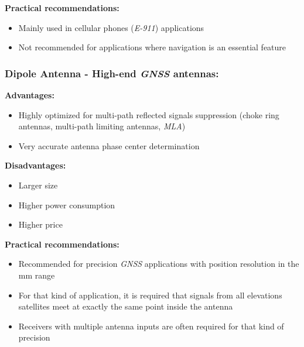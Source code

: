\documentclass[report.tex]{subfiles}
\begin{document}
\begin{flushleft}
\textbf{Practical recommendations:}
\end{flushleft}
\begin{itemize}
\item Mainly used in cellular phones (\textit{E-911}) applications
\item Not recommended for applications where navigation is an essential feature
\end{itemize}

\subsubsection{Dipole Antenna - High-end \textit{GNSS} antennas:}

\begin{flushleft}
\textbf{Advantages:}
\end{flushleft}
\begin{itemize}
\item Highly optimized for multi-path reflected signals suppression (choke ring antennas, multi-path limiting antennas, \textit{MLA})
\item Very accurate antenna phase center determination
\end{itemize}

\begin{flushleft}
\textbf{Disadvantages:}
\end{flushleft}
\begin{itemize}
\item Larger size
\item Higher power consumption
\item Higher price
\end{itemize}

\begin{flushleft}
\textbf{Practical recommendations:}
\end{flushleft}
\begin{itemize}
\item Recommended for precision \textit{GNSS} applications with position resolution in the \si{\milli\meter} range
\item For that kind of application, it is required that signals from all elevations  satellites meet at exactly the same point inside the antenna
\item Receivers with multiple antenna inputs are often required for that kind of precision
\end{itemize}
\end{document}

